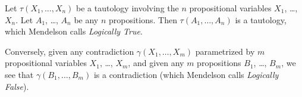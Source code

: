 \begin{node}\label{prop-000A}%
Let $\tau(X_{1},\dots,X_{n})$ be a tautology involving the $n$
propositional variables $X_{1}$, \dots, $X_{n}$. Let $A_{1}$, \dots,
$A_{n}$ be any $n$ propositions. Then $\tau(A_{1},\dots, A_{n})$ is a
tautology, which Mendelson calls \textit{Logically True}.

Conversely, given any contradiction $\gamma(X_{1},\dots, X_{m})$
parametrized by $m$ propositional variables $X_{1}$, \dots, $X_{m}$, and
given any $m$ propositions $B_{1}$, \dots, $B_{m}$, we see that
$\gamma(B_{1},\dots,B_{m})$ is a contradiction (which Mendelson calls
\textit{Logically False}).
\end{node}

